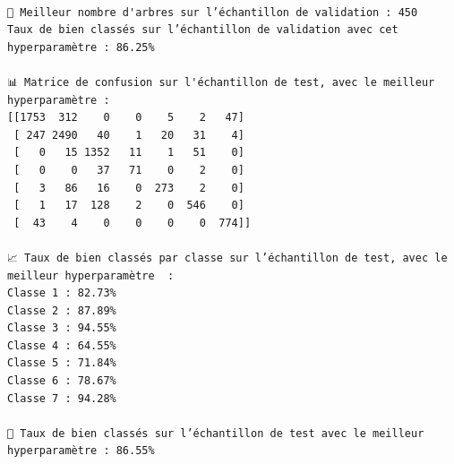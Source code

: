 \documentclass[
  letterpaper,
  DIV=11,
  numbers=noendperiod]{scrartcl}
\begin{document}
\begin{verbatim}

🔹 Meilleur nombre d'arbres sur l’échantillon de validation : 450
Taux de bien classés sur l’échantillon de validation avec cet hyperparamètre : 86.25%

📊 Matrice de confusion sur l'échantillon de test, avec le meilleur hyperparamètre :
[[1753  312    0    0    5    2   47]
 [ 247 2490   40    1   20   31    4]
 [   0   15 1352   11    1   51    0]
 [   0    0   37   71    0    2    0]
 [   3   86   16    0  273    2    0]
 [   1   17  128    2    0  546    0]
 [  43    4    0    0    0    0  774]]

📈 Taux de bien classés par classe sur l’échantillon de test, avec le meilleur hyperparamètre  :
Classe 1 : 82.73%
Classe 2 : 87.89%
Classe 3 : 94.55%
Classe 4 : 64.55%
Classe 5 : 71.84%
Classe 6 : 78.67%
Classe 7 : 94.28%

🔹 Taux de bien classés sur l’échantillon de test avec le meilleur hyperparamètre : 86.55%
\end{verbatim}
\end{document}
